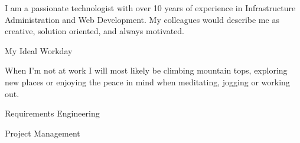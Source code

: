 




I am a passionate technologist with over 10 years of experience in
Infrastructure Administration and Web Development.
My colleagues would
describe me as
{\color{accent}creative},
{\color{accent}solution oriented},
and always {\color{accent}motivated}.


\vspace{1.9mm}

\begin{center}
{\small\color{body}My Ideal Workday}
\end{center}

\vspace{4.1mm}

When I'm not at work I will most likely be climbing mountain tops, exploring new places or
enjoying the peace in mind when meditating, jogging or working out.



%

\makebox[0pt][l]{%
  \hspace{1.5cm}
  \raisebox{-\totalheight}[0pt][0pt]{%
   {\color{background}\fontsize{250}{48}\faLaptop}
}}%
Requirements Engineering \hfill{}\vspace{0.3cm}

Project Management \hfill{}\vspace{0.3cm}


